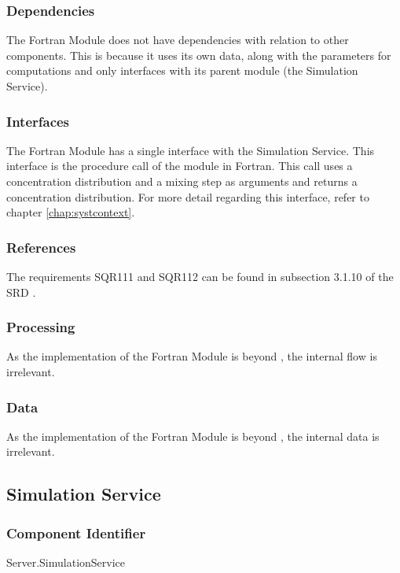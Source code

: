 \subsubsection*{Dependencies}
The Fortran Module does not have dependencies with relation to other components. This is because it uses its own data, along with the parameters for computations and only interfaces with its parent module (the Simulation Service).

\subsubsection*{Interfaces}
The Fortran Module has a single interface with the Simulation Service. This interface is the procedure call of the module in Fortran. This call uses a concentration distribution and a mixing step as arguments and returns a concentration distribution. For more detail regarding this interface, refer to  chapter \ref{chap:systcontext}.

\subsubsection*{References}
The requirements SQR111 and SQR112 can be found in subsection 3.1.10 of the SRD \cite{srd}.

\subsubsection*{Processing}
As the implementation of the Fortran Module is beyond \projectname, the internal flow is irrelevant.

\subsubsection*{Data}
As the implementation of the Fortran Module is beyond \projectname, the internal data is irrelevant.

\subsection{Simulation Service}

\subsubsection*{Component Identifier}
Server.SimulationService

